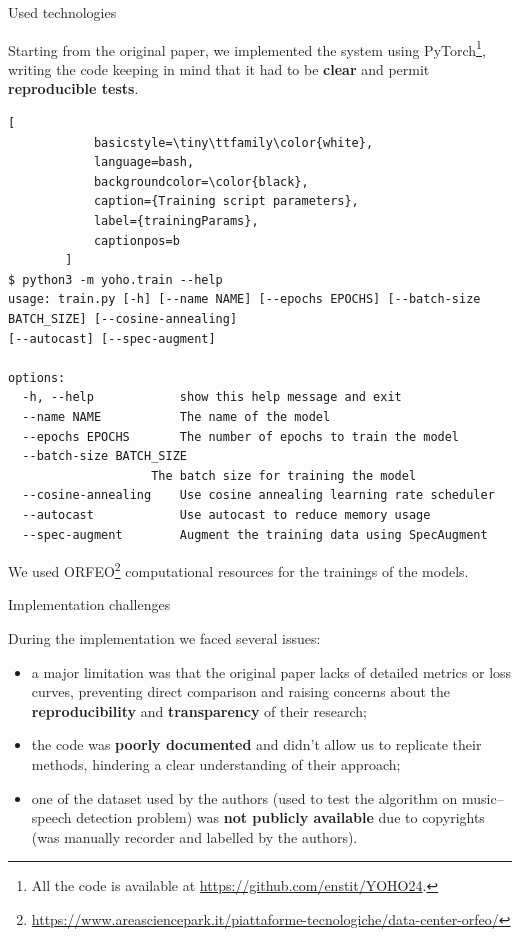 	\begin{frame}[fragile]{Used technologies}
	
		Starting from the original paper, we implemented the system using PyTorch\footnote{All the code is available at
		\url{https://github.com/enstit/YOHO24}.}, writing the code keeping in mind that it had to be \textbf{clear} and
		permit \textbf{reproducible tests}.
		
		\begin{lstlisting}[
			basicstyle=\tiny\ttfamily\color{white},
			language=bash,
			backgroundcolor=\color{black},
			caption={Training script parameters},
			label={trainingParams},
			captionpos=b
		]
$ python3 -m yoho.train --help
usage: train.py [-h] [--name NAME] [--epochs EPOCHS] [--batch-size BATCH_SIZE] [--cosine-annealing]
[--autocast] [--spec-augment]

options:
  -h, --help            show this help message and exit
  --name NAME           The name of the model
  --epochs EPOCHS       The number of epochs to train the model
  --batch-size BATCH_SIZE    
	                The batch size for training the model		  
  --cosine-annealing    Use cosine annealing learning rate scheduler
  --autocast            Use autocast to reduce memory usage
  --spec-augment        Augment the training data using SpecAugment
		\end{lstlisting}

		We used ORFEO\footnote{\url{https://www.areasciencepark.it/piattaforme-tecnologiche/data-center-orfeo/}}
		computational resources for the trainings of the models.
		
	\end{frame}
	
	\begin{frame}{Implementation challenges}

	During the implementation we faced several issues:
	
	\begin{itemize}
		\item {a major limitation was that the original paper lacks of detailed metrics or loss curves, preventing direct
			comparison and raising concerns about the \textbf{reproducibility} and \textbf{transparency} of their
			research;}
		\item {the code was \textbf{poorly documented} and didn’t allow us to replicate their methods, hindering a clear
			understanding of their approach;}
		\item {one of the dataset used by the authors (used to test the algorithm on music--speech detection problem) was \textbf{not publicly available} due to copyrights (was manually recorder and labelled by the authors).}
	\end{itemize}

	\end{frame}

